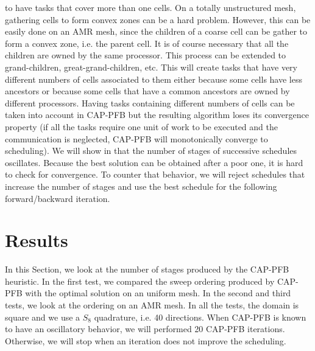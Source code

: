 \documentclass[letterpaper]{article}
\renewcommand{\(}{\left(}
\renewcommand{\)}{\right)}
\renewcommand{\[}{\left[}
\renewcommand{\]}{\right]}
\begin{document}
to have tasks that cover more than one cells. On a totally unstructured mesh,
gathering cells to form convex zones can be a hard problem. However, this can be
easily done on an AMR mesh, since the children of a coarse cell can be gather to
form a convex zone, i.e. the parent cell. It is of course necessary that all the children are owned by
the same processor. This process can be extended to grand-children,
great-grand-children, etc. This will create tasks that have very different
numbers of cells associated to them either because some cells have less ancestors or 
because some cells that have a common ancestors are owned by
different processors. Having tasks containing different numbers of cells can be
taken into account in CAP-PFB but the resulting algorithm loses its convergence
property (if all the tasks require one unit of work to be executed and the
communication is neglected, CAP-PFB will monotonically converge to scheduling). 
We will show in  that the number of stages of successive
schedules oscillates. Because the best solution can be obtained after a poor
one, it is hard to check for convergence. To counter that behavior, we will
reject schedules that increase the number of stages and use the best schedule
for the following forward/backward iteration.


\section{Results} \label{results}
In this Section, we look at the number of stages produced by the CAP-PFB heuristic. In
the first test, we compared the sweep ordering produced by CAP-PFB with the
optimal solution on an uniform mesh. In the second and third tests, we look at the ordering on an
AMR mesh. In all the tests, the domain is square and we use a $S_8$ quadrature, i.e. 40 directions. 
When CAP-PFB is known to have an oscillatory behavior, we will
performed 20 CAP-PFB iterations. Otherwise, we will stop when an iteration
does not improve the scheduling.
\end{document}
